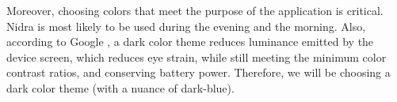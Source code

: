 Moreover, choosing colors that meet the purpose of the application is critical. Nidra is most likely to be used during the evening and the morning. Also, according to Google \cite{darktheme}, a dark color theme reduces luminance emitted by the device screen, which reduces eye strain, while still meeting the minimum color contrast ratios, and conserving battery power. Therefore, we will be choosing a dark color theme (with a nuance of dark-blue). 